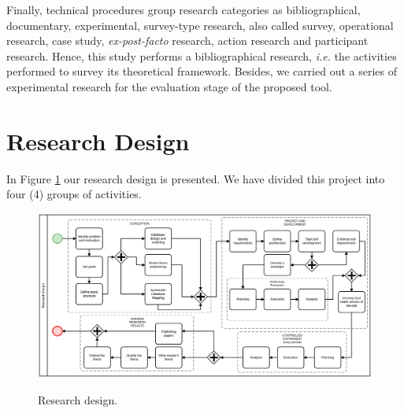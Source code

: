 Finally, technical procedures group research categories as bibliographical, documentary, experimental, survey-type research, also called survey, operational research, case study, \textit{ex-post-facto} research, action research and participant research.
Hence, this study performs a bibliographical research, \textit{i.e.} the activities performed to survey its theoretical framework. 
Besides, we carried out a series of experimental research for the evaluation stage of the proposed tool.

\section{Research Design}\label{met:researchdesign}

In Figure \ref{fig:ResearchDesign} our research design is presented.
We have divided this project into four (4) groups of activities.

\begin{figure}[!htb]
    \centering
    \caption{Research design.}
    \includegraphics[width=1\textwidth]{img/ResearchDesign.png}
    \label{fig:ResearchDesign}
\end{figure}

